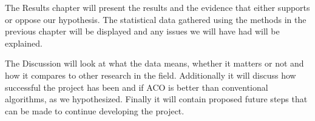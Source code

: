 The Results chapter will present the results and the evidence that either supports or oppose our hypothesis. The
statistical data gathered using the methods in the previous chapter will be displayed and any issues we will have had
will be explained.

The Discussion will look at what the data means, whether it matters or not and how it compares to other research in the field.
Additionally it will discuss how successful the project has been and if ACO is better than conventional algorithms, as we hypothesized.
Finally it will contain proposed future steps that can be made to continue developing the project.

